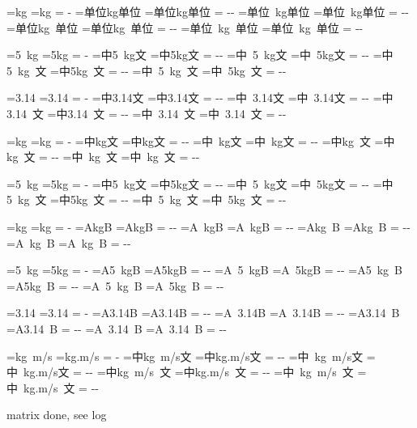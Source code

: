 \documentclass{article}
\newcommand\MatrixVariant[3]{%
  \MatrixReset
  \setbox\MatrixCandidateContext=\hbox{#2}%
  \MatrixReset
  \setbox\MatrixOracleContext=\hbox{#3}%
  \MatrixDelta=\dimexpr
    \wd\MatrixCandidateContext-\wd\MatrixOracleContext-
    \MatrixIntrinsicDelta\relax
  \ifdim\MatrixDelta<0pt
    \MatrixDelta=-\MatrixDelta
  \fi
  \ifdim\MatrixDelta<0.01pt
    \typeout{MATRIX|\MatrixLabel|#1|PASS|delta=\the\MatrixDelta}%
  \else
    \typeout{MATRIX|\MatrixLabel|#1|FAIL|delta=\the\MatrixDelta}%
  \fi
}
\newcommand\Matrix[5]{%
  \def\MatrixLabel{#1}%
  \MatrixReset
  \setbox\MatrixCandidate=\hbox{#3}%
  \MatrixReset
  \setbox\MatrixOracle=\hbox{#4}%
  \MatrixIntrinsicDelta=\dimexpr
    \wd\MatrixCandidate-\wd\MatrixOracle\relax
  \MatrixVariant{00}{#2#3#5}{#2#4#5}%
  \MatrixVariant{10}{#2 #3#5}{#2 #4#5}%
  \MatrixVariant{01}{#2#3 #5}{#2#4 #5}%
  \MatrixVariant{11}{#2 #3 #5}{#2 #4 #5}%
}
\begin{document}
\Matrix{unit/CDC}{单位}{\unit{kg}}{kg}{单位}
\Matrix{qty/CDC}{中}{\qty{5}{kg}}{5kg}{文}
\Matrix{num/CDC}{中}{\num{3.14}}{3.14}{文}
\Matrix{si/CDC}{中}{\si{kg}}{kg}{文}
\Matrix{SI/CDC}{中}{\SI{5}{kg}}{5kg}{文}

\Matrix{unit/WDW}{A}{\unit{kg}}{kg}{B}
\Matrix{qty/WDW}{A}{\qty{5}{kg}}{5kg}{B}
\Matrix{num/WDW}{A}{\num{3.14}}{3.14}{B}

\Matrix{unit-opt/CDC}{中}{\unit[per-mode=symbol]{kg.m/s}}{kg.m/s}{文}

matrix done, see log
\end{document}
